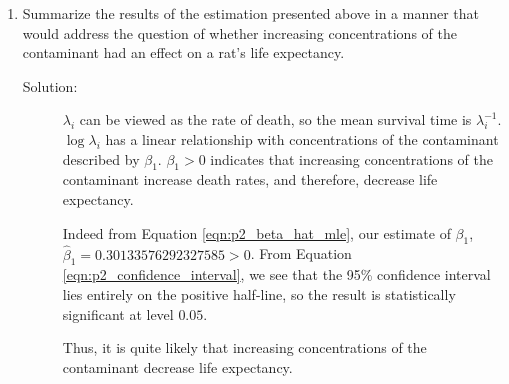 \documentclass[letterpaper,11pt]{article}
\begin{document}
\begin{enumerate}
\begin{enumerate}
  \item Summarize the results of the estimation presented above in a manner that
    would address the question of whether increasing concentrations of the
    contaminant had an effect on a rat's life expectancy.

    \begin{description}
    \item[Solution:] $\lambda_i$ can be viewed as the rate of death, so the mean
      survival time is $\lambda_i^{-1}$. $\log\lambda_i$ has a linear
      relationship with concentrations of the contaminant described by
      $\beta_1$. $\beta_1 > 0$ indicates that increasing concentrations of the
      contaminant increase death rates, and therefore, decrease life expectancy.

      Indeed from Equation \ref{eqn:p2_beta_hat_mle}, our estimate of $\beta_1$,
      $\hat{\beta}_1 = 0.30133576292327585 > 0$. From Equation
      \ref{eqn:p2_confidence_interval}, we see that the 95\% confidence interval
      lies entirely on the positive half-line, so the result is statistically
      significant at level $0.05$.

      Thus, it is quite likely that increasing concentrations of the contaminant
      decrease life expectancy.
    \end{description}
  \end{enumerate}  
\end{enumerate}
\end{document}
